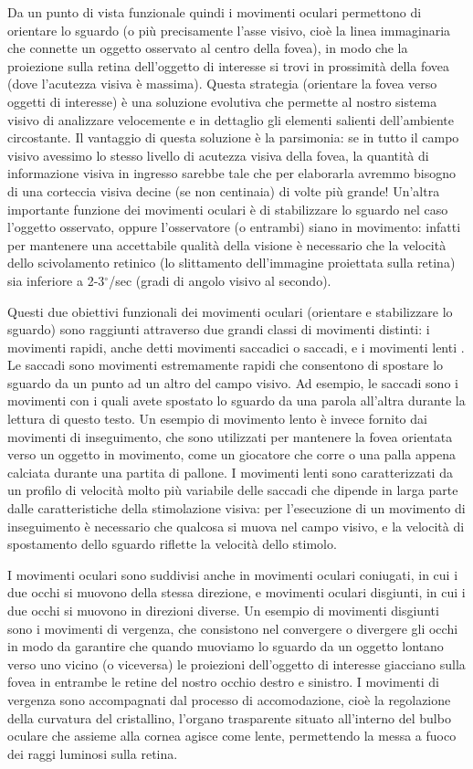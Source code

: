 \documentclass[12pt]{article}
\begin{document}
Da un punto di vista funzionale quindi i movimenti oculari permettono di orientare lo sguardo (o più precisamente l'asse visivo, cioè la linea immaginaria che connette un oggetto osservato al centro della fovea), in modo che la proiezione sulla retina dell'oggetto di interesse si trovi in prossimità della fovea (dove l'acutezza visiva è massima). Questa strategia (orientare la fovea verso oggetti di interesse) è una soluzione evolutiva che permette al nostro sistema visivo di analizzare velocemente e in dettaglio gli elementi salienti dell'ambiente circostante. Il vantaggio di questa soluzione è la parsimonia: se in tutto il campo visivo avessimo lo stesso livello di acutezza visiva della fovea, la quantità di informazione visiva in ingresso sarebbe tale che per elaborarla avremmo bisogno di una corteccia visiva decine (se non centinaia) di volte più grande! Un'altra importante funzione dei movimenti oculari è di stabilizzare lo sguardo nel caso l'oggetto osservato, oppure l'osservatore (o entrambi) siano in movimento: infatti per mantenere una accettabile qualità della visione è necessario che la velocità dello scivolamento retinico (lo slittamento dell'immagine proiettata sulla retina) sia inferiore a 2-3$^{\circ}$/sec (gradi di angolo visivo al secondo). 

Questi due obiettivi funzionali dei movimenti oculari (orientare e stabilizzare lo sguardo) sono raggiunti attraverso due grandi classi di movimenti distinti: i movimenti rapidi, anche detti movimenti saccadici o saccadi, e i movimenti lenti \cite{Steinman1990}. Le saccadi sono movimenti estremamente rapidi che consentono di spostare lo sguardo da un punto ad un altro del campo visivo. Ad esempio, le saccadi sono i movimenti con i quali avete spostato lo sguardo da una parola all'altra durante la lettura di questo testo. Un esempio di movimento lento è invece fornito dai movimenti di inseguimento, che sono utilizzati per mantenere la fovea orientata verso un oggetto in movimento, come un giocatore che corre o una palla appena calciata durante una partita di pallone. I movimenti lenti sono caratterizzati da un profilo di velocità molto più variabile delle saccadi che dipende in larga parte dalle caratteristiche della stimolazione visiva: per l'esecuzione di un movimento di inseguimento è necessario che qualcosa si muova nel campo visivo, e la velocità di spostamento dello sguardo riflette la velocità dello stimolo. 

I movimenti oculari sono suddivisi  anche in movimenti oculari coniugati, in cui i due occhi si muovono della stessa direzione, e movimenti oculari disgiunti, in cui i due occhi si muovono in direzioni diverse. Un esempio di movimenti disgiunti sono i movimenti di vergenza, che consistono nel convergere o divergere gli occhi in modo da garantire che quando muoviamo lo sguardo da un oggetto lontano verso uno vicino (o viceversa) le proiezioni dell'oggetto di interesse giacciano sulla fovea in entrambe le retine del nostro occhio destro e sinistro. I movimenti di vergenza sono accompagnati dal processo di accomodazione, cioè la regolazione della curvatura del cristallino, l'organo trasparente situato all'interno del bulbo oculare che assieme alla cornea agisce come lente, permettendo la messa a fuoco dei raggi luminosi sulla retina.
\end{document}
